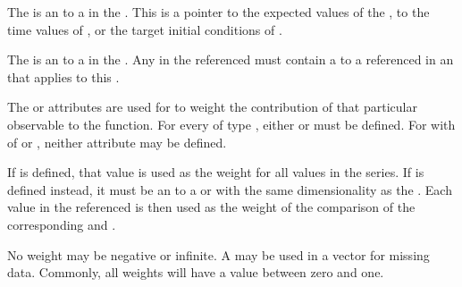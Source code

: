 \begin{blockChanged}
The  is an \SIdRef to a \DataSource in the \SedDocument.  This is a pointer to the expected values of the  \FitMappings, to the time values of  \FitMappings, or the target initial conditions of  \FitMappings.

The  is an \SIdRef to a \DataGenerator in the \SedDocument.  Any \Variable in the referenced \DataGenerator must contain a  to a \Model referenced in an \AdjustableParameter that applies to this \FitExperiment.

The  or  attributes are used for  \FitMappings to weight the contribution of that particular observable to the \Objective function.  For every \FitMapping of type , either  or  must be defined.  For \FitMappings with  of  or , neither attribute may be defined.

If  is defined, that value is used as the weight for all values in the series.  If  is defined instead, it must be an \SIdRef to a \DataGenerator or \DataSource with the same dimensionality as the .  Each value in the referenced  is then used as the weight of the comparison of the corresponding  and .

No weight may be negative or infinite.  A  may be used in a  vector for missing data.  Commonly, all weights will have a value between zero and one.






\end{blockChanged}
